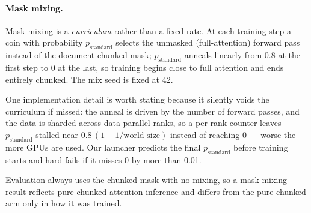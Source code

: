 \paragraph{Mask mixing.}
\begin{claudeblock}
Mask mixing is a \emph{curriculum} rather than a fixed rate. At each training step a coin with
probability $p_{\text{standard}}$ selects the unmasked (full-attention) forward pass instead of the
document-chunked mask; $p_{\text{standard}}$ anneals linearly from $0.8$ at the first step to $0$
at the last, so training begins close to full attention and ends entirely chunked. The mix seed is
fixed at 42.

One implementation detail is worth stating because it silently voids the curriculum if missed:
the anneal is driven by the number of forward passes, and the data is sharded across data-parallel
ranks, so a per-rank counter leaves $p_{\text{standard}}$ stalled near
$0.8\,(1 - 1/\text{world\_size})$ instead of reaching 0 --- worse the more GPUs are used. Our
launcher predicts the final $p_{\text{standard}}$ before training starts and hard-fails if it misses
0 by more than 0.01.

Evaluation always uses the chunked mask with no mixing, so a mask-mixing result reflects pure
chunked-attention inference and differs from the pure-chunked arm only in how it was trained.
\end{claudeblock}


